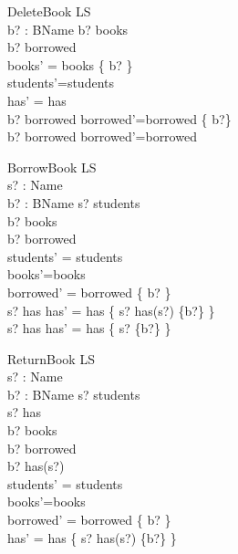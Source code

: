 \begin{schema}{DeleteBook}
 \Delta LS \\
 b? : BName 
\where
 b? \in books \\
 b? \notin borrowed \\
 books' = books \setminus \{ b? \} \\
 students'=students\\
 has' = has\\
 b? \in borrowed \implies borrowed'=borrowed \setminus\{ b?\}\\
 b? \notin borrowed \implies borrowed'=borrowed
\end{schema}

\begin{schema}{BorrowBook}
 \Delta LS \\
 s? : Name\\
 b? : BName
\where
 s? \in students \\
 b? \in books\\
 b? \notin borrowed\\
 students' = students \\
 books'=books\\
 borrowed' = borrowed \cup \{ b? \} \\
 s? \in \dom has \implies has' = has \oplus \{ s? \mapsto has(s?) \cup \{b?\} \} \\
 s? \notin \dom has \implies has' = has \cup \{ s? \mapsto \{b?\} \}
\end{schema}

\begin{schema}{ReturnBook}
 \Delta LS \\
 s? : Name\\
 b? : BName
\where
 s? \in students \\
 s? \in \dom has \\
 b? \in books\\
 b? \in borrowed\\
 b? \in has(s?) \\
 students' = students \\
 books'=books\\
 borrowed' = borrowed \setminus \{ b? \} \\
 has' = has \oplus \{ s? \mapsto has(s?) \setminus \{b?\} \} \\
\end{schema}


